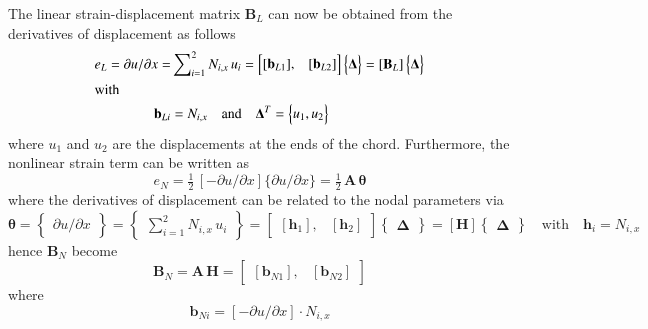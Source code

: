 The linear strain-displacement matrix $\mathbf{B}_L$ can now be obtained from the derivatives of displacement as follows
\begin{subequations}
	\begin{align}
e_L  = 
\partial u / \partial x   = &
\sum\nolimits_{i=1}^2 N_{i,x} \, u_i = \begin{bmatrix}
[\mathbf{b}_{L1}], & [\mathbf{b}_{L2}]
\end{bmatrix}  \begin{Bmatrix} \boldsymbol{\Delta} \end{Bmatrix}  
= [\mathbf{B}_L] \begin{Bmatrix} \boldsymbol{\Delta} \end{Bmatrix}\\
 \intertext{with} \mathbf{b}_{Li}  & = 
N_{i,x} \quad \text{and} \quad
\mathbf{\Delta}^T  = 
\begin{Bmatrix}
u_1 ,u_2
\end{Bmatrix} 
\end{align}
\end{subequations}
where $u_1$ and $u_2$ are the displacements at the ends of the chord.  Furthermore, the nonlinear strain term can be written as 
\begin{equation}
e_ N =  \tfrac{1}{2} \,
 [-\partial u / \partial x ]
\{\partial u / \partial x\}
= \tfrac{1}{2} \, \mathbf{A} \, \boldsymbol{\theta}
\end{equation}
where the derivatives of displacement can be related to the nodal parameters via
\begin{equation}
\boldsymbol{\theta} =  \begin{Bmatrix}
\partial u / \partial x
\end{Bmatrix}
= \begin{Bmatrix}
\sum\nolimits_{i=1}^2 N_{i,x} \, u_i
\end{Bmatrix} 
= \begin{bmatrix}
[\mathbf{h}_1], & [\mathbf{h}_2]
\end{bmatrix}  \begin{Bmatrix} \boldsymbol{\Delta} \end{Bmatrix}  
= [\mathbf{H}] \begin{Bmatrix} \boldsymbol{\Delta} \end{Bmatrix} \quad \text{with} \quad \mathbf{h}_i = N_{i,x}  
\end{equation}
hence $\mathbf{B}_N$ become
\begin{equation}
\mathbf{B}_N = \mathbf{A} \, \mathbf{H}  =  \begin{bmatrix}
[\mathbf{b}_{N1}], & [\mathbf{b}_{N2}] 
\end{bmatrix} 
\end{equation}
where
\begin{equation}
\mathbf{b}_{Ni}  =   
 [-\partial u / \partial x] \cdot
N_{i,x} 
\end{equation}

